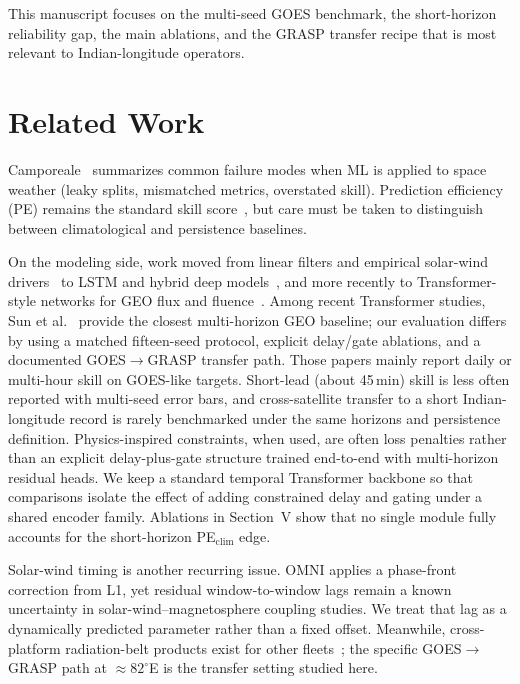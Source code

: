 \documentclass[conference]{IEEEtran}
\begin{document}
This manuscript focuses on the multi-seed GOES benchmark, the
short-horizon reliability gap, the main ablations, and the GRASP transfer
recipe that is most relevant to Indian-longitude operators.

\section{Related Work}
Camporeale~\cite{b11} summarizes common failure modes when ML is
applied to space weather (leaky splits, mismatched metrics, overstated skill).
Prediction efficiency (PE) remains the standard skill score~\cite{b12}, but care must be taken to distinguish between climatological and persistence baselines.

On the modeling side, work moved from linear filters and empirical solar-wind
drivers~\cite{b3,b4,b13} to LSTM and hybrid deep
models~\cite{b5,b6,b7}, and more recently to
Transformer-style networks for GEO flux and fluence~\cite{b8,b9,b10}.
Among recent Transformer studies, Sun et al.~\cite{b10} provide the closest multi-horizon GEO baseline; our evaluation differs by using a matched fifteen-seed protocol, explicit delay/gate ablations, and a documented GOES$\rightarrow$GRASP transfer path.
Those papers mainly report daily or multi-hour skill on GOES-like targets.
Short-lead (about 45\,min) skill is less often reported with multi-seed error bars,
and cross-satellite transfer to a short Indian-longitude record is rarely
benchmarked under the same horizons and persistence definition. Physics-inspired
constraints, when used, are often loss penalties rather than an explicit
delay-plus-gate structure trained end-to-end with multi-horizon residual heads.
We keep a standard temporal Transformer backbone so that comparisons
isolate the effect of adding constrained delay and gating under a shared
encoder family. Ablations in
Section~V show that no single module fully accounts for the short-horizon
PE\(_{\mathrm{clim}}\) edge.

Solar-wind timing is another recurring issue. OMNI applies a
phase-front correction from L1, yet residual window-to-window lags remain
a known uncertainty in solar-wind--magnetosphere coupling studies. We treat that lag as a dynamically
predicted parameter rather than a fixed offset. Meanwhile, cross-platform radiation-belt products
exist for other fleets~\cite{b15}; the specific GOES\(\rightarrow\)GRASP
path at \(\approx 82^\circ\)E is the transfer setting studied here.
\end{document}
